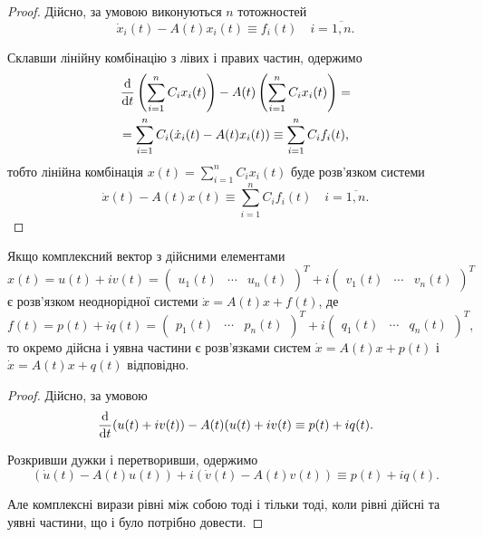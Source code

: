 \begin{proof}
	Дійсно, за умовою виконуються $n$ тотожностей
	\begin{equation*}
		\dot x_i(t) - A(t) x_i(t) \equiv f_i(t) \quad i = \overline{1, n}.
	\end{equation*}

	Склавши лінійну комбінацію з лівих і правих частин, одержимо
	\begin{multline*}
		\frac{\mathop{}\!\mathrm{d}}{\mathop{}\!\mathrm{d} t} \left( \sum_{i = 1}^n C_i x_i(t) \right) - A(t) \left( \sum_{i = 1}^n C_i x_i(t) \right) = \\
		= \sum_{i = 1}^n C_i (\dot x_i(t) - A(t) x_i(t) ) \equiv \sum_{i = 1}^n C_i f_i(t),
	\end{multline*}
	тобто лінійна комбінація $x(t) = \sum_{i = 1}^n C_i x_i(t)$ буде розв'язком системи
	\begin{equation*}
		\dot x(t) - A(t) x(t) \equiv \sum_{i = 1}^n C_i f_i(t) \quad i = \overline{1, n}.
	\end{equation*}
\end{proof}

\begin{property}
	Якщо комплексний вектор з дійсними елементами 
	\begin{equation*}
		x(t) = u(t) + i v(t) = \begin{pmatrix} u_1(t) & \cdots & u_n(t) \end{pmatrix}^T + i \begin{pmatrix} v_1(t) & \cdots & v_n(t) \end{pmatrix}^T
	\end{equation*}
	є розв'язком неоднорідної системи $\dot x = A(t) x + f(t)$, де 
	\begin{equation*}
		f(t) = p(t) + i q(t) = \begin{pmatrix} p_1(t) & \cdots & p_n(t) \end{pmatrix}^T + i \begin{pmatrix} q_1(t) & \cdots & q_n(t) \end{pmatrix}^T,
	\end{equation*}
	то окремо дійсна і уявна частини є розв'язками систем $\dot x = A(t) x + p(t)$ і $\dot x = A(t) x + q(t)$ відповідно.
\end{property}

\begin{proof}
	Дійсно, за умовою
	\begin{equation*}
		\frac{\mathop{}\!\mathrm{d}}{\mathop{}\!\mathrm{d} t} (u(t) + i v(t)) - A(t) (u(t) + i v(t) \equiv p(t) + i q(t).
	\end{equation*}

	Розкривши дужки і перетворивши, одержимо
	\begin{equation*}
		(\dot u(t) - A(t) u(t)) + i (\dot v(t) - A(t) v(t)) \equiv p(t) + i q(t).
	\end{equation*}
	
	Але комплексні вирази рівні між собою тоді і тільки тоді, коли рівні дійсні та уявні частини, що і було потрібно довести.
\end{proof}

